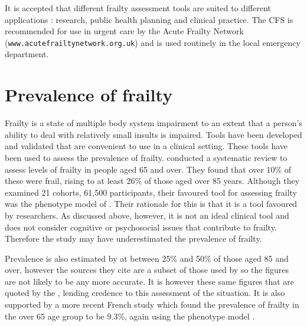 \documentclass
[
	12pt,
	a4paper,
	oneside,
]{report}
\begin{document}
It is accepted that different frailty assessment tools are suited to different
applications \parencite{ensrud:08,martin:08,romero-ortuno:16}: research, public
health planning and clinical practice. The CFS is recommended for use in urgent
care by the Acute Frailty Network (\texttt{www.acutefrailtynetwork.org.uk}) 
and is used routinely in the local emergency department.

\section{Prevalence of frailty}
\label{sec:litrevprev}

Frailty is a state of multiple body system impairment to an extent that a
person's ability to deal with relatively small insults is impaired. Tools have 
been developed and validated that are convenient to use in a clinical setting.
These tools have been used to assess the prevalence of frailty. 
\textcite{collard:12} conducted a systematic review 
to assess levels of frailty in people aged 65 and over. They found that over
10\% of these were frail, rising to at least 26\% of those aged over 85 years.
Although they examined 21 cohorts, 61,500 participants, their favoured tool for 
assessing frailty was the phenotype model of \textcite{fried:01}. Their 
rationale
for this is that it is a tool favoured by researchers. As discussed 
above, however, it is not an ideal clinical tool and does not consider 
cognitive or
psychosocial issues that contribute to frailty. Therefore the study may have 
underestimated the prevalence of frailty.

Prevalence is also estimated by \textcite{clegg:13} at between 25\% and 50\% of
those aged 85 and over, however the sources they cite are a subset of those
used by \textcite{collard:12} so the figures are not likely to be any more
accurate. It is however these same figures that are quoted by the
\textcite{bgs:14}, lending credence to this assessment of the situation. It
is also supported by a more recent French study which found the prevalence of
frailty in the over 65 age group to be 9.3\%, again using the phenotype model
\parencite{cossec:16}.
\end{document}
